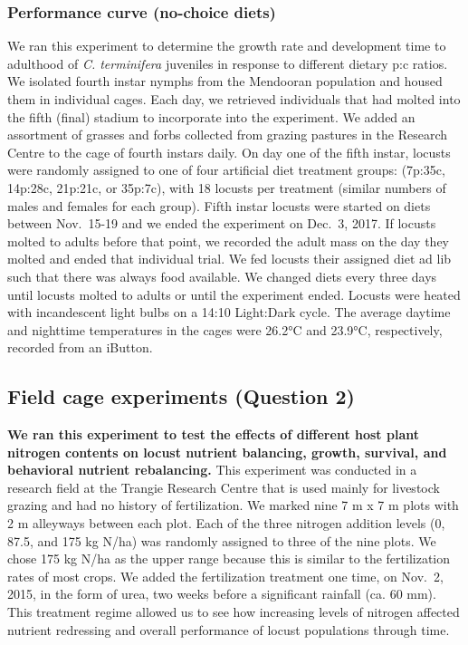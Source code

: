 \documentclass[
]{article}
\begin{document}
\subsubsection{Performance curve (no-choice
diets)}\label{performance-curve-no-choice-diets}

We ran this experiment to determine the growth rate and development time
to adulthood of \emph{C. terminifera} juveniles in response to different
dietary p:c ratios. We isolated fourth instar nymphs from the Mendooran
population and housed them in individual cages. Each day, we retrieved
individuals that had molted into the fifth (final) stadium to
incorporate into the experiment. We added an assortment of grasses and
forbs collected from grazing pastures in the Research Centre to the cage
of fourth instars daily. On day one of the fifth instar, locusts were
randomly assigned to one of four artificial diet treatment groups:
(7p:35c, 14p:28c, 21p:21c, or 35p:7c), with 18 locusts per treatment
(similar numbers of males and females for each group). Fifth instar
locusts were started on diets between Nov.~15-19 and we ended the
experiment on Dec.~3, 2017. If locusts molted to adults before that
point, we recorded the adult mass on the day they molted and ended that
individual trial. We fed locusts their assigned diet ad lib such that
there was always food available. We changed diets every three days until
locusts molted to adults or until the experiment ended. Locusts were
heated with incandescent light bulbs on a 14:10 Light:Dark cycle. The
average daytime and nighttime temperatures in the cages were 26.2°C and
23.9°C, respectively, recorded from an iButton.

\subsection{Field cage experiments (Question
2)}\label{field-cage-experiments-question-2}

\textbf{We ran this experiment to test the effects of different host
plant nitrogen contents on locust nutrient balancing, growth, survival,
and behavioral nutrient rebalancing.} This experiment was conducted in a
research field at the Trangie Research Centre that is used mainly for
livestock grazing and had no history of fertilization. We marked nine 7
m x 7 m plots with 2 m alleyways between each plot. Each of the three
nitrogen addition levels (0, 87.5, and 175 kg N/ha) was randomly
assigned to three of the nine plots. We chose 175 kg N/ha as the upper
range because this is similar to the fertilization rates of most crops.
We added the fertilization treatment one time, on Nov.~2, 2015, in the
form of urea, two weeks before a significant rainfall (ca. 60 mm). This
treatment regime allowed us to see how increasing levels of nitrogen
affected nutrient redressing and overall performance of locust
populations through time.
\end{document}
